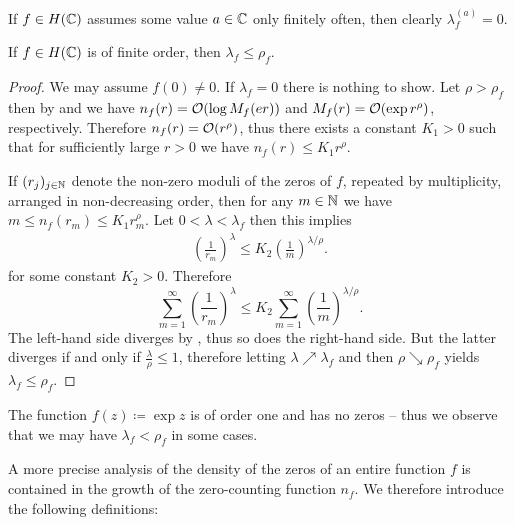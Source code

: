 If $f \in H(\mathbb{C})$ assumes some value $a \in \mathbb{C}$ only finitely often, then clearly $\lambda_f^{(a)} = 0$.

\begin{theorem} \label{thm:inequality-order-exponent-of-convergence}
    If $f \in H(\mathbb{C})$ is of finite order, then $\lambda_f \leq \rho_f$.
\end{theorem}

\begin{proof}
    We may assume $f(0) \neq 0$. If $\lambda_f = 0$ there is nothing to show. Let $\rho > \rho_f$ then
    by  and  we have $n_f(r) = \mathcal{O}(\log M_f(er))$ and $M_f(r) = \mathcal{O}(\exp r^\rho)$, respectively. Therefore $n_f(r) = \mathcal{O}(r^\rho)$, thus there exists a constant $K_1 > 0$ such that for sufficiently large $r > 0$ we have $n_f(r) \leq K_1 r^\rho$.
    
    If $(r_j)_{j \in \mathbb{N}}$ denote the non-zero moduli of the zeros of $f$, repeated by multiplicity, arranged in non-decreasing order, then for any $m \in \mathbb{N}$ we have $m \leq n_f(r_m) \leq K_1 r_m^{\rho}$. Let $0 < \lambda < \lambda_f$ then this implies
    \begin{align*}
        \left( \frac{1}{r_m} \right)^{\lambda} \leq K_2 \left( \frac{1}{m} \right)^{\lambda/\rho}.
    \end{align*}
    for some constant $K_2 > 0$. Therefore
    \begin{equation*}
        \sum_{m=1}^\infty \left( \frac{1}{r_m} \right)^{\lambda} \leq K_2 \sum_{m=1}^\infty \left( \frac{1}{m} \right)^{\lambda/\rho}.
    \end{equation*}
    The left-hand side diverges by , thus so does the right-hand side. But the latter diverges if and only if $\frac{\lambda}{\rho} \leq 1$, therefore letting $\lambda \nearrow \lambda_f$ and then $\rho \searrow \rho_f$ yields $\lambda_f \leq \rho_f$.
\end{proof}

\begin{remark}
    The function $f(z) \coloneqq \exp z$ is of order one and has no zeros -- thus we observe that we may have $\lambda_f < \rho_f$ in some cases.
\end{remark}

A more precise analysis of the density of the zeros of an entire function $f$ is contained in the growth of the zero-counting function $n_f$. We therefore introduce the following definitions:

